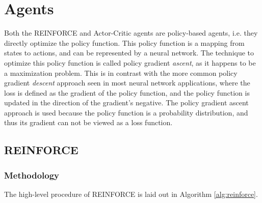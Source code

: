 \documentclass{article}
\begin{document}
\section{Agents}
\label{Agents}

Both the REINFORCE and Actor-Critic agents are policy-based agents, i.e. they directly optimize the policy function.
This policy function is a mapping from states to actions, and can be represented by a neural network.
The technique to optimize this policy function is called policy gradient \textit{ascent}, as it happens to be a maximization problem.
This is in contrast with the more common policy gradient \textit{descent} approach seen in most neural network applications, where the loss is defined as the gradient of the policy function, and the policy function is updated in the direction of the gradient's negative.
The policy gradient ascent approach is used because the policy function is a probability distribution, and thus its gradient can not be viewed as a loss function.

\subsection{REINFORCE}
\label{A-REINFORCE}


\subsubsection{Methodology}
\label{R-Method}


The high-level procedure of REINFORCE is laid out in Algorithm \ref{alg:reinforce}.

\end{document}
